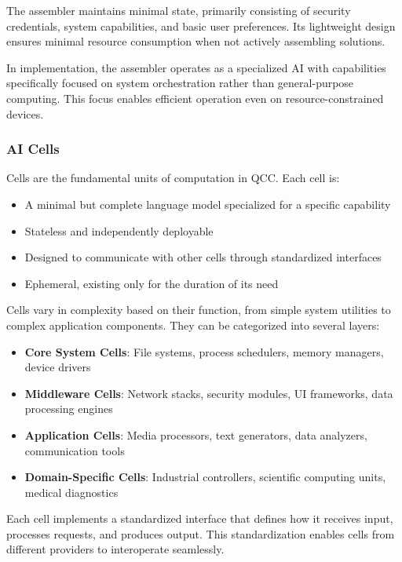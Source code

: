 \documentclass[11pt,a4paper]{article}
\begin{document}
The assembler maintains minimal state, primarily consisting of security credentials, system capabilities, and basic user preferences. Its lightweight design ensures minimal resource consumption when not actively assembling solutions.

In implementation, the assembler operates as a specialized AI with capabilities specifically focused on system orchestration rather than general-purpose computing. This focus enables efficient operation even on resource-constrained devices.

\subsubsection{AI Cells}

Cells are the fundamental units of computation in QCC. Each cell is:

\begin{itemize}
    \item A minimal but complete language model specialized for a specific capability
    \item Stateless and independently deployable
    \item Designed to communicate with other cells through standardized interfaces
    \item Ephemeral, existing only for the duration of its need
\end{itemize}

Cells vary in complexity based on their function, from simple system utilities to complex application components. They can be categorized into several layers:

\begin{itemize}
    \item \textbf{Core System Cells}: File systems, process schedulers, memory managers, device drivers
    \item \textbf{Middleware Cells}: Network stacks, security modules, UI frameworks, data processing engines
    \item \textbf{Application Cells}: Media processors, text generators, data analyzers, communication tools
    \item \textbf{Domain-Specific Cells}: Industrial controllers, scientific computing units, medical diagnostics
\end{itemize}

Each cell implements a standardized interface that defines how it receives input, processes requests, and produces output. This standardization enables cells from different providers to interoperate seamlessly.
\end{document}
